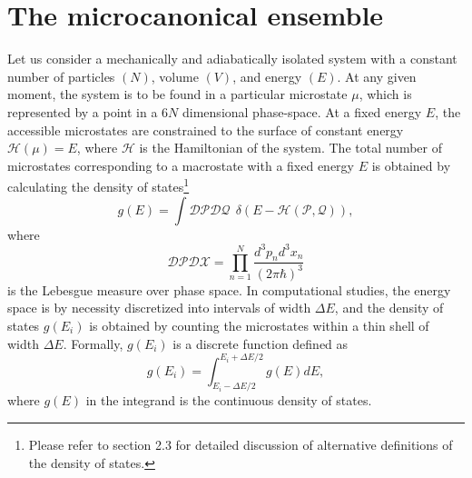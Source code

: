 \documentclass[12pt]{report}
\begin{document}
\section{The microcanonical ensemble}
\label{sec:mic_ensemble}
Let us consider a mechanically and adiabatically isolated system with a constant number of particles $(N)$, volume $(V)$, and energy $(E)$. At any given moment, the system is to be found in a particular microstate $\mu$, which is represented by a point in a $6N$ dimensional phase-space. At a fixed energy $E$, the accessible microstates are constrained to the surface of constant energy $\mathcal{H}(\mu) = E$, where $\mathcal{H}$ is the Hamiltonian of the system. The total number of microstates corresponding to a macrostate with a fixed energy $E$ is obtained by calculating the density of states\footnote{Please refer to section 2.3 for detailed discussion of alternative definitions of the density of states.}
\begin{equation}
\label{eq:densityOfStatesTheoretic}
g(E) = \int \mathcal{DP}\mathcal{DQ} \:\: \delta(E - \mathcal{H}(\mathcal{P},\mathcal{Q})),
\end{equation} 
where 
\begin{equation}
\mathcal{DP}\mathcal{DX} = \prod_{n = 1}^{N} \frac{d^{3}p_{n}d^{3}x_{n}}{(2 \pi \hbar)^{3}}
\end{equation}
is the Lebesgue measure over phase space\cite{Rugh2001}. In computational studies, the energy space is by necessity discretized into intervals of width $\Delta E$, and the density of states $g(E_{i})$ is obtained by counting the microstates within a thin shell of width $\Delta E$. Formally, $g(E_{i})$ is a discrete function defined as
\begin{equation}
g(E_{i}) = \int _{E_{i}-\Delta E/2} ^{E_{i}+\Delta E/2} g(E)dE,
\end{equation}
where $g(E)$ in the integrand is the continuous density of states\cite{Bachmann2014}.
\end{document}
